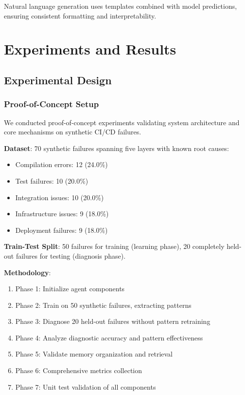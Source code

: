 \documentclass[11pt]{article}
\begin{document}
Natural language generation uses templates combined with model predictions, ensuring consistent formatting and interpretability.

\section{Experiments and Results}

\subsection{Experimental Design}

\subsubsection{Proof-of-Concept Setup}

We conducted proof-of-concept experiments validating system architecture and core mechanisms on synthetic CI/CD failures.

\textbf{Dataset}: 70 synthetic failures spanning five layers with known root causes:
\begin{itemize}
    \item Compilation errors: 12 (24.0\%)
    \item Test failures: 10 (20.0\%)
    \item Integration issues: 10 (20.0\%)
    \item Infrastructure issues: 9 (18.0\%)
    \item Deployment failures: 9 (18.0\%)
\end{itemize}

\textbf{Train-Test Split}: 50 failures for training (learning phase), 20 completely held-out failures for testing (diagnosis phase).

\textbf{Methodology}: 
\begin{enumerate}
    \item Phase 1: Initialize agent components
    \item Phase 2: Train on 50 synthetic failures, extracting patterns
    \item Phase 3: Diagnose 20 held-out failures without pattern retraining
    \item Phase 4: Analyze diagnostic accuracy and pattern effectiveness
    \item Phase 5: Validate memory organization and retrieval
    \item Phase 6: Comprehensive metrics collection
    \item Phase 7: Unit test validation of all components
\end{enumerate}
\end{document}
